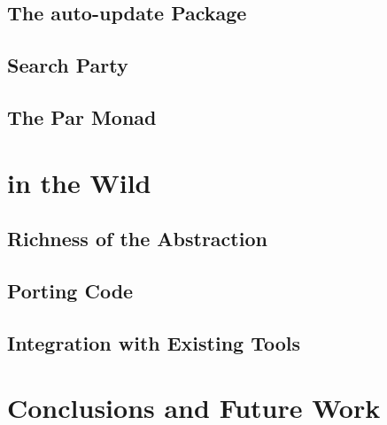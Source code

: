 \blindtext

\subsection{The auto-update Package}
\subsection{Search Party}
\subsection{The Par Monad}

\section{\dejafu{} in the Wild}
\label{sec:dejafu-evaluation}

\blindtext

\subsection{Richness of the Abstraction}
\subsection{Porting Code}
\subsection{Integration with Existing Tools}

\section{Conclusions and Future Work}
\label{sec:dejafu-conclusions}

\blindtext
